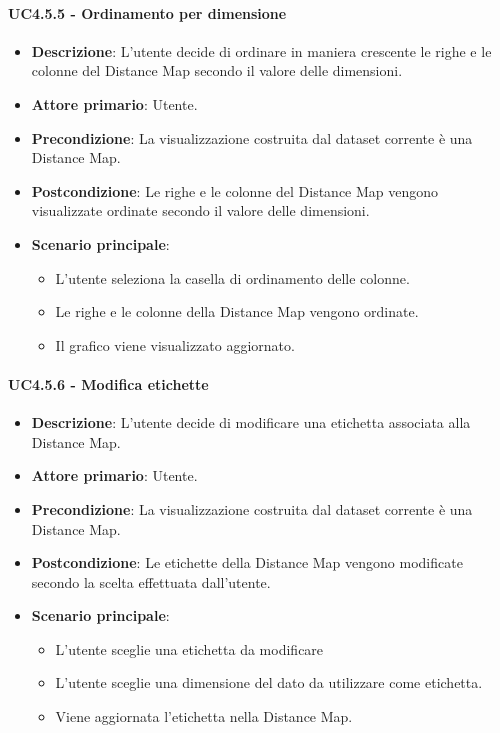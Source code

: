 \paragraph{UC4.5.5 - Ordinamento per dimensione}
\label{par:uc4.5.5}
\begin{itemize}
    \item \textbf{Descrizione}: L'utente decide di ordinare in maniera crescente le righe e le colonne del Distance Map secondo il valore delle dimensioni.
    \item \textbf{Attore primario}: Utente.
    \item \textbf{Precondizione}: La visualizzazione costruita dal dataset corrente è una Distance Map.
    \item \textbf{Postcondizione}: Le righe e le colonne del Distance Map vengono visualizzate ordinate secondo il valore delle dimensioni.
    \item \textbf{Scenario principale}:
    \begin{itemize}
        \item L'utente seleziona la casella di ordinamento delle colonne.
        \item Le righe e le colonne della Distance Map vengono ordinate.
        \item Il grafico viene visualizzato aggiornato.
    \end{itemize}
\end{itemize}


\paragraph{UC4.5.6 - Modifica etichette}
\label{par:uc4.5.6}
\begin{itemize}
    \item \textbf{Descrizione}: L'utente decide di modificare una etichetta associata alla Distance Map.
    \item \textbf{Attore primario}: Utente.
    \item \textbf{Precondizione}: La visualizzazione costruita dal dataset corrente è una Distance Map.
    \item \textbf{Postcondizione}: Le etichette della Distance Map vengono modificate secondo la scelta effettuata dall'utente.
    \item \textbf{Scenario principale}:
    \begin{itemize}
        \item L'utente sceglie una etichetta da modificare
        \item L'utente sceglie una dimensione del dato da utilizzare come etichetta.
        \item Viene aggiornata l'etichetta nella Distance Map.
    \end{itemize}
\end{itemize}


